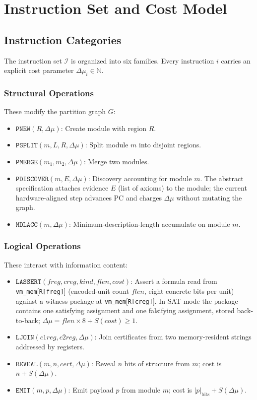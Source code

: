 \documentclass[11pt, a4paper]{report}
\theoremstyle{definition}
\theoremstyle{plain}
\newcommand{\N}{\mathbb{N}}
\newcommand{\Ispace}{\mathcal{I}}
\begin{document}
\chapter{Instruction Set and Cost Model}

\section{Instruction Categories}
The instruction set $\Ispace$ is organized into six families. Every instruction $i$ carries an explicit cost parameter $\Delta\mu_i \in \N$.

\subsection{Structural Operations}
These modify the partition graph $G$:
\begin{itemize}
    \item $\texttt{PNEW}(R, \Delta\mu)$: Create module with region $R$.
    \item $\texttt{PSPLIT}(m, L, R, \Delta\mu)$: Split module $m$ into disjoint regions.
    \item $\texttt{PMERGE}(m_1, m_2, \Delta\mu)$: Merge two modules.
    \item $\texttt{PDISCOVER}(m, E, \Delta\mu)$: Discovery accounting for module $m$. The abstract specification attaches evidence $E$ (list of axioms) to the module; the current hardware-aligned step advances PC and charges $\Delta\mu$ without mutating the graph.
    \item $\texttt{MDLACC}(m, \Delta\mu)$: Minimum-description-length accumulate on module $m$.
\end{itemize}

\subsection{Logical Operations}
These interact with information content:
\begin{itemize}
    \item $\texttt{LASSERT}(\mathit{freg}, \mathit{creg}, \mathit{kind}, \mathit{flen}, \mathit{cost})$: Assert a formula read from \texttt{vm\_mem}[\texttt{R[freg]}] (encoded-unit count $\mathit{flen}$, eight concrete bits per unit) against a witness package at \texttt{vm\_mem}[\texttt{R[creg]}]. In SAT mode the package contains one satisfying assignment and one falsifying assignment, stored back-to-back; $\Delta\mu = \mathit{flen} \times 8 + S(\mathit{cost}) \geq 1$.
    \item $\texttt{LJOIN}(\mathit{c1reg}, \mathit{c2reg}, \Delta\mu)$: Join certificates from two memory-resident strings addressed by registers.
    \item $\texttt{REVEAL}(m, n, \mathit{cert}, \Delta\mu)$: Reveal $n$ bits of structure from $m$; cost is $n + S(\Delta\mu)$.
    \item $\texttt{EMIT}(m, p, \Delta\mu)$: Emit payload $p$ from module $m$; cost is $|p|_{\mathrm{bits}} + S(\Delta\mu)$.
\end{itemize}
\end{document}
